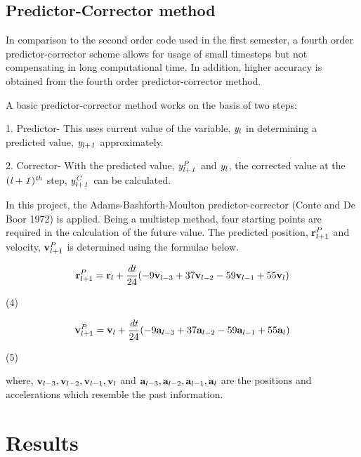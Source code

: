 \documentclass{article}
\begin{document}
\subsection{Predictor-Corrector method}
{\normalsize{
In comparison to the second order code used in the first semester, a fourth order predictor-corrector scheme allows for usage of small timesteps but not compensating in long computational time. In addition, higher accuracy is obtained from the fourth order predictor-corrector method.

A basic predictor-corrector method works on the basis of two steps:

\medskip

1. Predictor- This uses current value of the variable, ${\it y_l}$ in determining a predicted value, ${\it y_{l+1}}$ approximately.

\smallskip

2. Corrector- With the predicted value, ${\it y_{l+1}^P}$ and ${\it y_l}$, the corrected value at the ${\it (l+1)^{th}}$ step, ${\it y_{l+1}^C}$ can be calculated.

\medskip

In this project, the Adams-Bashforth-Moulton predictor-corrector (Conte and De Boor 1972) is applied. Being a multistep method, four starting points are required in the calculation of the future value. The predicted position, ${{\bf r}_{l+1}^P}$ and velocity, ${{\bf v}_{l+1}^P}$ is determined using the formulae below.

\[ {\bf r}_{l+1}^P = {\bf r}_l + \frac{{\it dt}} {24} (-9{\bf v}_{l-3} + 37{\bf v}_{l-2} - 59{\bf v}_{l-1} + 55{\bf v}_l) \]
\begin{flushright} (4) \end{flushright}

\[ {\bf v}_{l+1}^P = {\bf v}_l + \frac{{\it dt}} {24} (-9{\bf a}_{l-3} + 37{\bf a}_{l-2} - 59{\bf a}_{l-1} + 55{\bf a}_l) \]
\begin{flushright} (5) \end{flushright}

\smallskip

where,
\smallskip
${\bf v}_{l-3}, {\bf v}_{l-2}, {\bf v}_{l-1}, {\bf v}_l$ and ${\bf a}_{l-3}, {\bf a}_{l-2}, {\bf a}_{l-1}, {\bf a}_l$ are the positions and accelerations which resemble the past information.

\smallskip

}}

\section{Results}
\end{document}
